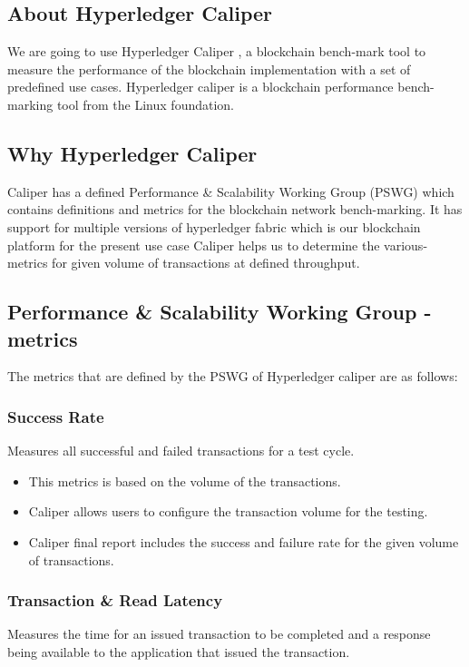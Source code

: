 \documentclass{ceadar_article}
\begin{document}
\subsection{About Hyperledger Caliper}
We are going to use Hyperledger Caliper \cite{hyperledgerCaliper}, a blockchain bench-mark tool to measure the performance of the blockchain implementation with a set of predefined use cases. \newline
Hyperledger caliper is a blockchain performance bench-marking tool from the Linux foundation. 

\subsection{Why Hyperledger Caliper}
Caliper has a defined Performance \& Scalability Working Group (PSWG) \cite{pswg} which contains definitions and metrics for the blockchain network bench-marking. \newline
It has support for multiple versions of hyperledger fabric which is our blockchain platform for the present use case\newline
Caliper helps us to determine the various-metrics for given volume of transactions at defined throughput.

\subsection {Performance \& Scalability Working Group - metrics}
The metrics that are defined by the PSWG of Hyperledger caliper are as follows:

\subsubsection{Success Rate} 
Measures all successful and failed transactions for a test cycle.
\begin{itemize}
    \item This metrics is based on the volume of the transactions.
    \item Caliper allows users to configure the transaction volume for the testing.
    \item Caliper final report includes the success and failure rate for the given volume of transactions.
\end{itemize}


\subsubsection{Transaction \& Read Latency} 
Measures the time for an issued transaction to be completed and a response being available to the application that issued the transaction. 
\end{document}
